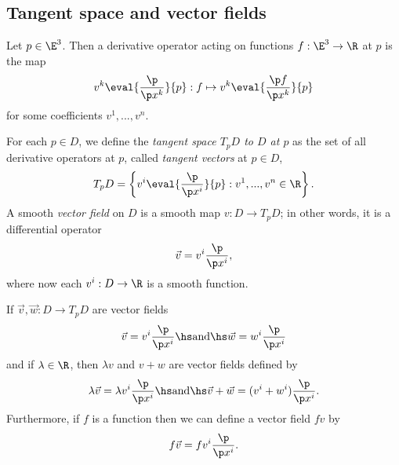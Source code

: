 \documentclass{article}
\begin{document}
\subsection{Tangent space and vector fields}

\begin{definition}
    Let $p\in\E^3$. Then a derivative operator acting on functions $f:\E^3\to\R$
    at $p$ is the map
    \begin{align*}
        v^k \eval{\frac{\p }{\p x^k}}{p} : 
        f \mapsto v^k \eval{\frac{\p f}{\p x^k}}{p}    
    \end{align*}
    for some coefficients $v^1,...,v^n$.
\end{definition}

\begin{definition}
    For each $p\in D$, we define the \emph{tangent space $T_pD$ to $D$ at $p$} as the
    set of all derivative operators at $p$, called \emph{tangent vectors} at $p\in D$,
    \begin{align*}
        T_p D =\left\lbrace v^i \eval{\frac{\p}{\p x^i}}{p}: v^1,...,v^n\in\R\right\rbrace.
    \end{align*}
    A smooth \emph{vector field} on $D$ is a smooth map $v:D\to T_pD$; in other words,
    it is a differential operator
    \begin{align*}
        \vec v = v^i\frac{\p}{\p x^i},
    \end{align*}
    where now each $v^i:D\to\R$ is a smooth function.
\end{definition}

\begin{definition}
    If $\vec v,\vec w:D\to T_pD$ are vector fields
    \begin{align*}
        \vec v = v^i \frac{\p}{\p x^i}\hs\text{and}\hs \vec w = w^i \frac{\p }{\p x^i}
    \end{align*}
    and if $\lambda\in\R$, then $\lambda v$ and $v+w$ are vector fields defined by
    \begin{align*}
        \lambda \vec v = \lambda v^i \frac{\p }{\p x^i}\hs\text{and}\hs
        \vec v+\vec w = (v^i+w^i)\frac{\p }{\p x^i}.
    \end{align*}
    Furthermore, if $f$ is a function then we can define a vector field $fv$ by
    \begin{align*}
        f\vec v = fv^i\frac{\p }{\p x^i}.
    \end{align*}
\end{definition}
\end{document}
